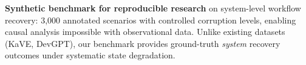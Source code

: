     \item \textbf{Synthetic benchmark for reproducible research} on system-level workflow recovery: 3,000 annotated scenarios with controlled corruption levels, enabling causal analysis impossible with observational data. Unlike existing datasets (KaVE, DevGPT), our benchmark provides ground-truth \textit{system} recovery outcomes under systematic state degradation.
